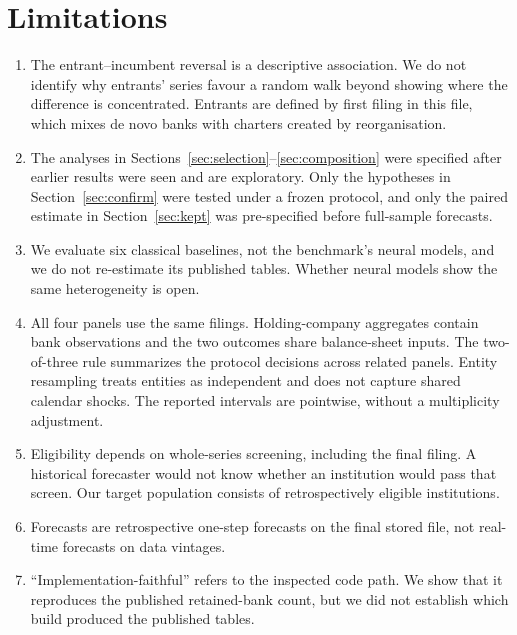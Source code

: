 \documentclass[11pt]{article}
\begin{document}
\section{Limitations}
\begin{enumerate}
  \item The entrant--incumbent reversal is a descriptive association. We do not identify why entrants' series favour a random walk beyond showing where the difference is concentrated. Entrants are defined by first filing in this file, which mixes de novo banks with charters created by reorganisation.
  \item The analyses in Sections~\ref{sec:selection}--\ref{sec:composition} were specified after earlier results were seen and are exploratory. Only the hypotheses in Section~\ref{sec:confirm} were tested under a frozen protocol, and only the paired estimate in Section~\ref{sec:kept} was pre-specified before full-sample forecasts.
  \item We evaluate six classical baselines, not the benchmark's neural models, and we do not re-estimate its published tables. Whether neural models show the same heterogeneity is open.
  \item All four panels use the same filings. Holding-company aggregates contain bank observations and the two outcomes share balance-sheet inputs. The two-of-three rule summarizes the protocol decisions across related panels. Entity resampling treats entities as independent and does not capture shared calendar shocks. The reported intervals are pointwise, without a multiplicity adjustment.
  \item Eligibility depends on whole-series screening, including the final filing. A historical forecaster would not know whether an institution would pass that screen. Our target population consists of retrospectively eligible institutions.
  \item Forecasts are retrospective one-step forecasts on the final stored file, not real-time forecasts on data vintages.
  \item ``Implementation-faithful'' refers to the inspected code path. We show that it reproduces the published retained-bank count, but we did not establish which build produced the published tables.
\end{enumerate}

\end{document}
